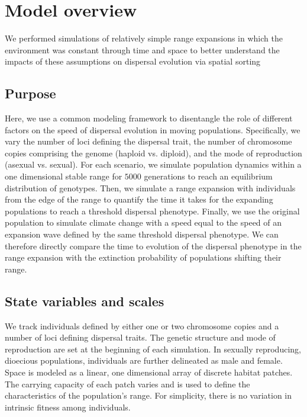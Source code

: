 \documentclass[11pt]{article}
\begin{document}
\section*{Model overview}

We performed simulations of relatively simple range expansions in which the environment was constant through time and space to better understand the impacts of these assumptions on dispersal evolution via spatial sorting

\subsection*{Purpose} 
Here, we use a common modeling framework to disentangle the role of different factors on the speed of dispersal evolution in moving populations. Specifically, we vary the number of loci defining the dispersal trait, the number of chromosome copies comprising the genome (haploid vs. diploid), and the mode of reproduction (asexual vs. sexual). For each scenario, we simulate population dynamics within a one dimensional stable range for $5000$ generations to reach an equilibrium distribution of genotypes. Then, we simulate a range expansion with individuals from the edge of the range to quantify the time it takes for the expanding populations to reach a threshold dispersal phenotype. Finally, we use the original population to simulate climate change with a speed equal to the speed of an expansion wave defined by the same threshold dispersal phenotype. We can therefore directly compare the time to evolution of the dispersal phenotype in the range expansion with the extinction probability of populations shifting their range.

\subsection*{State variables and scales} 
We track individuals defined by either one or two chromosome copies and a number of loci defining dispersal traits. The genetic structure and mode of reproduction are set at the beginning of each simulation. In sexually reproducing, dioecious populations, individuals are further delineated as male and female. Space is modeled as a linear, one dimensional array of discrete habitat patches. The carrying capacity of each patch varies and is used to define the characteristics of the population's range. For simplicity, there is no variation in intrinsic fitness among individuals.
\end{document}
